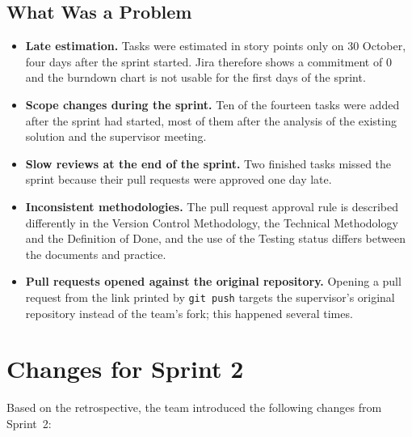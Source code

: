 \documentclass[12pt,a4paper]{article}
\begin{document}
\subsection{What Was a Problem}

\begin{itemize}
    \item \textbf{Late estimation.} Tasks were estimated in story points only
          on 30 October, four days after the sprint started. Jira therefore
          shows a commitment of 0 and the burndown chart is not usable for
          the first days of the sprint.
    \item \textbf{Scope changes during the sprint.} Ten of the fourteen tasks
          were added after the sprint had started, most of them after the
          analysis of the existing solution and the supervisor meeting.
    \item \textbf{Slow reviews at the end of the sprint.} Two finished tasks
          missed the sprint because their pull requests were approved one
          day late.
    \item \textbf{Inconsistent methodologies.} The pull request approval rule
          is described differently in the Version Control Methodology, the
          Technical Methodology and the Definition of Done, and the use of
          the Testing status differs between the documents and practice.
    \item \textbf{Pull requests opened against the original repository.}
          Opening a pull request from the link printed by \texttt{git push}
          targets the supervisor's original repository instead of the team's
          fork; this happened several times.
\end{itemize}




\section{Changes for Sprint 2}

Based on the retrospective, the team introduced the following changes
from Sprint~2:
\end{document}
